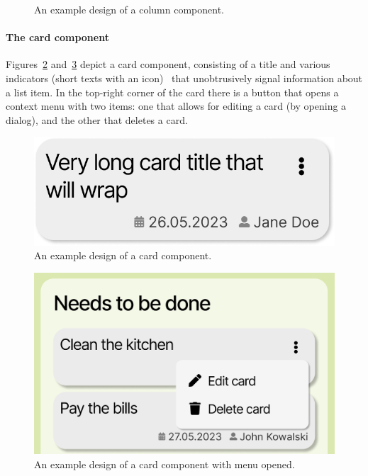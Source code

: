\begin{figure}
    \caption{An example design of a column component.}
    \label{fig:3-4-column-component}
\end{figure}

\paragraph{The card component}
Figures~\ref{fig:3-4-card-component} and~\ref{fig:3-4-card-component-with-menu} depict a card component, consisting of a title and various indicators (short texts with an icon) \textendash\ that unobtrusively signal information about a list item.
In the top-right corner of the card there is a button that opens a context menu with two items: one that allows for editing a card (by opening a dialog), and the other that deletes a card.

\begin{figure}
    \centering
    \includegraphics[width=\textwidth]{./3-research-methodology/card-component}
    \caption{An example design of a card component.}
    \label{fig:3-4-card-component}
\end{figure}

\begin{figure}
    \centering
    \includegraphics[width=\textwidth]{./3-research-methodology/card-component-with-menu}
    \caption{An example design of a card component with menu opened.}
    \label{fig:3-4-card-component-with-menu}
\end{figure}

